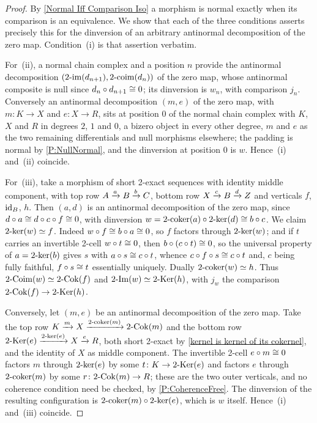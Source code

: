 \begin{proof}
  \leanok
  By \lemx\ref{Normal Iff Comparison Iso} a morphism is normal exactly when its comparison is an equivalence. We show that each of the three conditions asserts precisely this for the dinversion of an arbitrary antinormal decomposition of the zero map. Condition~(i) is that assertion verbatim.

	For~(ii), a normal chain complex and a position \(n\) provide the antinormal decomposition \((2\text{-}\mathrm{im}(d_{n+1}),2\text{-}\mathrm{coim}(d_n))\) of the zero map, whose antinormal composite is null since \(d_n\circ d_{n+1}\cong 0\); its dinversion is \(w_n\), with comparison \(j_n\). Conversely an antinormal decomposition \((m,e)\) of the zero map, with \(m\colon K\to X\) and \(e\colon X\to R\), sits at position \(0\) of the normal chain complex with \(K\), \(X\) and \(R\) in degrees \(2\), \(1\) and \(0\), a bizero object in every other degree, \(m\) and \(e\) as the two remaining differentials and null morphisms elsewhere; the padding is normal by \prox\ref{P:NullNormal}, and the dinversion at position \(0\) is \(w\). Hence~(i) and~(ii) coincide.

	For~(iii), take a morphism of short 2-exact sequences with identity middle component, with top row \(A\xrightarrow[]{a}B\xrightarrow[]{b}C\), bottom row \(X\xrightarrow[]{c}B\xrightarrow[]{d}Z\) and verticals \(f\), \(\operatorname{id}_{B}\), \(h\). Then \((a,d)\) is an antinormal decomposition of the zero map, since \(d\circ a\cong d\circ c\circ f\cong 0\), with dinversion \(w=2\text{-}\mathrm{coker}(a)\circ2\text{-}\mathrm{ker}(d)\cong b\circ c\). We claim \(2\text{-}\mathrm{ker}(w)\simeq f\). Indeed \(w\circ f\cong b\circ a\cong 0\), so \(f\) factors through \(2\text{-}\mathrm{ker}(w)\); and if \(t\) carries an invertible 2-cell \(w\circ t\cong 0\), then \(b\circ(c\circ t)\cong 0\), so the universal property of \(a=2\text{-}\mathrm{ker}(b)\) gives \(s\) with \(a\circ s\cong c\circ t\), whence \(c\circ f\circ s\cong c\circ t\) and, \(c\) being fully faithful, \(f\circ s\cong t\) essentially uniquely. Dually \(2\text{-}\mathrm{coker}(w)\simeq h\). Thus \(2\text{-}\mathrm{Coim}(w)\simeq2\text{-}\mathrm{Cok}(f)\) and \(2\text{-}\mathrm{Im}(w)\simeq2\text{-}\mathrm{Ker}(h)\), with \(j_w\) the comparison \(2\text{-}\mathrm{Cok}(f)\to2\text{-}\mathrm{Ker}(h)\).

	Conversely, let \((m,e)\) be an antinormal decomposition of the zero map. Take the top row \(K\xrightarrow[]{m}X\xrightarrow[]{2\text{-}\mathrm{coker}(m)}2\text{-}\mathrm{Cok}(m)\) and the bottom row \(2\text{-}\mathrm{Ker}(e)\xrightarrow[]{2\text{-}\mathrm{ker}(e)}X\xrightarrow[]{e}R\), both short 2-exact by \prox\ref{kernel is kernel of its cokernel}, and the identity of \(X\) as middle component. The invertible 2-cell \(e\circ m\cong 0\) factors \(m\) through \(2\text{-}\mathrm{ker}(e)\) by some \(t\colon K\to2\text{-}\mathrm{Ker}(e)\) and factors \(e\) through \(2\text{-}\mathrm{coker}(m)\) by some \(r\colon2\text{-}\mathrm{Cok}(m)\to R\); these are the two outer verticals, and no coherence condition need be checked, by \prox\ref{P:CoherenceFree}. The dinversion of the resulting configuration is \(2\text{-}\mathrm{coker}(m)\circ2\text{-}\mathrm{ker}(e)\), which is \(w\) itself. Hence~(i) and~(iii) coincide.
\end{proof}

